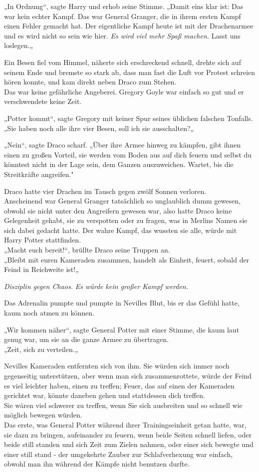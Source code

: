 {„In Ordnung“, sagte Harry und erhob seine Stimme. „Damit eins klar ist: Das war kein echter Kampf. Das war General Granger, die in ihrem ersten Kampf einen Fehler gemacht hat. Der eigentliche Kampf heute ist mit der Drachenarmee und es wird nicht so sein wie hier. \emph{Es wird viel mehr Spaß machen.} Lasst uns loslegen.„

Ein Besen fiel vom Himmel, näherte sich erschreckend schnell, drehte sich auf seinem Ende und bremste so stark ab, dass man fast die Luft vor Protest schreien hören konnte, und kam direkt neben Draco zum Stehen.\\ Das war keine gefährliche Angeberei. Gregory Goyle war einfach so gut und er verschwendete keine Zeit.

„Potter kommt“, sagte Gregory mit keiner Spur seines üblichen falschen Tonfalls.\\ „Sie haben noch alle ihre vier Besen, soll ich sie ausschalten?„

„Nein“, sagte Draco scharf. „Über ihre Armee hinweg zu kämpfen, gibt ihnen einen zu großen Vorteil, sie werden vom Boden aus auf dich feuern und selbst du könntest nicht in der Lage sein, dem Ganzen auszuweichen. Wartet, bis die Streitkräfte angreifen."

Draco hatte vier Drachen im Tausch gegen zwölf Sonnen verloren.\\ Anscheinend war General Granger tatsächlich so unglaublich dumm gewesen, obwohl sie nicht unter den Angreifern gewesen war, also hatte Draco keine Gelegenheit gehabt, sie zu verspotten oder zu fragen, was in Merlins Namen sie sich dabei gedacht hatte. Der wahre Kampf, das wussten sie alle, würde mit Harry Potter stattfinden.\\ „Macht euch bereit!“, brüllte Draco seine Truppen an.\\ „Bleibt mit euren Kameraden zusammen, handelt als Einheit, feuert, sobald der Feind in Reichweite ist!„

\emph{Disziplin gegen Chaos.} \emph{Es würde kein großer Kampf werden.}

Das Adrenalin pumpte und pumpte in Nevilles Blut, bis er das Gefühl hatte, kaum noch atmen zu können.

„Wir kommen näher“, sagte General Potter mit einer Stimme, die kaum laut genug war, um sie an die ganze Armee zu übertragen.\\ „Zeit, sich zu verteilen.„

Nevilles Kameraden entfernten sich von ihm. Sie würden sich immer noch gegenseitig unterstützen, aber wenn man sich zusammenrottete, würde der Feind es viel leichter haben, einen zu treffen; Feuer, das auf einen der Kameraden gerichtet war, könnte daneben gehen und stattdessen dich treffen.\\ Sie wären viel schwerer zu treffen, wenn Sie sich ausbreiten und so schnell wie möglich bewegen würden.\\ Das erste, was General Potter während ihrer Trainingseinheit getan hatte, war, sie dazu zu bringen, aufeinander zu feuern, wenn beide Seiten schnell liefen, oder beide still standen und sich Zeit zum Zielen nahmen, oder einer sich bewegte und einer still stand - der umgekehrte Zauber zur Schlafverhexung war einfach, obwohl man ihn während der Kämpfe nicht benutzen durfte.

}
